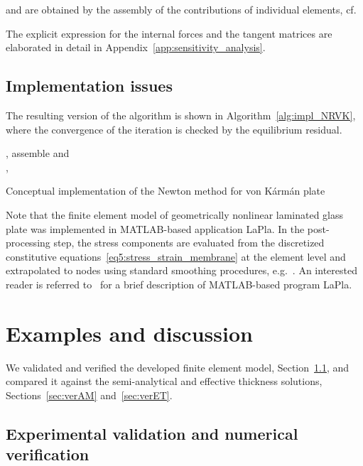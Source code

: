 \documentclass[11pt]{article}
\begin{document}
and are obtained by the assembly of the contributions of individual elements, cf.~\citep{Bittnar:1996:NMM}  
 
The explicit expression for the internal forces and the tangent matrices are
elaborated in detail in Appendix~\ref{app:sensitivity_analysis}. 

\subsection{Implementation issues}\label{sec:algorithm}
The resulting version of the algorithm is shown in Algorithm~\ref{alg:impl_NRVK}, where the convergence of the iteration is checked by the equilibrium residual.

\begin{algorithm}[ht]
 \KwResult{, }
 , 
 assemble  and \\ 
 , 
 \caption{Conceptual implementation of the Newton method for von
 K\'{a}rm\'{a}n plate}
 \label{alg:impl_NRVK}
\end{algorithm}

Note that the finite element model of geometrically nonlinear laminated glass plate was implemented in MATLAB-based application LaPla. In the post-processing step, the stress components are evaluated from the discretized constitutive equations~\eqref{eq5:stress_strain_membrane} at the element level and extrapolated to nodes using standard smoothing procedures, e.g.~\citep{Hinton:1974:LGS}. An interested reader is referred to~\cite{Zemanova:2014:NMLG} for a brief description of MATLAB-based program LaPla. 


\section{Examples and discussion}\label{sec:examples} 


We validated and verified the developed finite element model, Section~\ref{sec:validation}, and compared it against the semi-analytical and effective thickness solutions, Sections~\ref{sec:verAM} and~\ref{sec:verET}. 

\subsection{Experimental validation and numerical verification}\label{sec:validation} 
\end{document}
